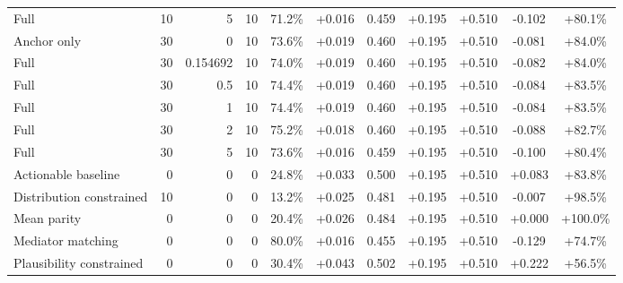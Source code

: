 \begin{table}[htbp]
\begin{tabular}{lrrrccccccc}
Full & 10 & 5 & 10 & 71.2\% & +0.016 & 0.459 & +0.195 & +0.510 & -0.102 & +80.1\% \\
Anchor only & 30 & 0 & 10 & 73.6\% & +0.019 & 0.460 & +0.195 & +0.510 & -0.081 & +84.0\% \\
Full & 30 & 0.154692 & 10 & 74.0\% & +0.019 & 0.460 & +0.195 & +0.510 & -0.082 & +84.0\% \\
Full & 30 & 0.5 & 10 & 74.4\% & +0.019 & 0.460 & +0.195 & +0.510 & -0.084 & +83.5\% \\
Full & 30 & 1 & 10 & 74.4\% & +0.019 & 0.460 & +0.195 & +0.510 & -0.084 & +83.5\% \\
Full & 30 & 2 & 10 & 75.2\% & +0.018 & 0.460 & +0.195 & +0.510 & -0.088 & +82.7\% \\
Full & 30 & 5 & 10 & 73.6\% & +0.016 & 0.459 & +0.195 & +0.510 & -0.100 & +80.4\% \\
Actionable baseline & 0 & 0 & 0 & 24.8\% & +0.033 & 0.500 & +0.195 & +0.510 & +0.083 & +83.8\% \\
Distribution constrained & 10 & 0 & 0 & 13.2\% & +0.025 & 0.481 & +0.195 & +0.510 & -0.007 & +98.5\% \\
Mean parity & 0 & 0 & 0 & 20.4\% & +0.026 & 0.484 & +0.195 & +0.510 & +0.000 & +100.0\% \\
Mediator matching & 0 & 0 & 0 & 80.0\% & +0.016 & 0.455 & +0.195 & +0.510 & -0.129 & +74.7\% \\
Plausibility constrained & 0 & 0 & 0 & 30.4\% & +0.043 & 0.502 & +0.195 & +0.510 & +0.222 & +56.5\% \\
\bottomrule
\end{tabular}
\end{table}